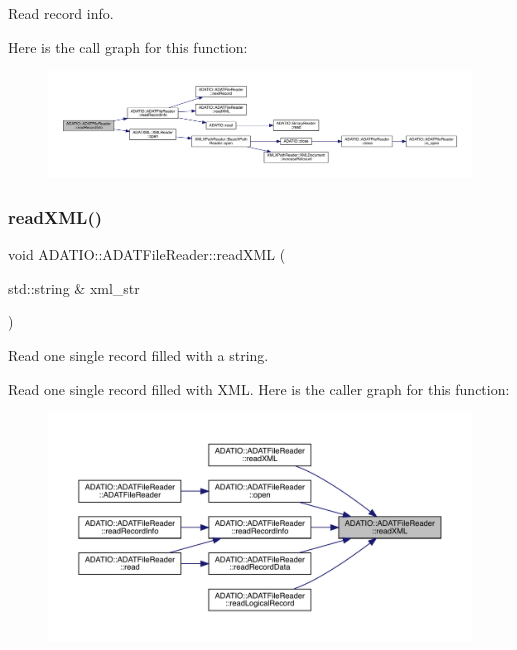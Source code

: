 Read record info. 

Here is the call graph for this function\+:
\nopagebreak
\begin{figure}[H]
\begin{center}
\leavevmode
\includegraphics[width=350pt]{db/de5/group__qio_ga4d771a46d7db77cd0ae5999113733795_cgraph}
\end{center}
\end{figure}
\mbox{\label{group__qio_gae57feac2bf53666ac092bb0a43125226}} 
\subsubsection{\texorpdfstring{readXML()}{readXML()}\hspace{0.1cm}{\footnotesize\ttfamily [1/2]}}
{\footnotesize\ttfamily void A\+D\+A\+T\+I\+O\+::\+A\+D\+A\+T\+File\+Reader\+::read\+X\+ML (\begin{DoxyParamCaption}\item[{std\+::string \&}]{xml\+\_\+str }\end{DoxyParamCaption})\hspace{0.3cm}{\ttfamily [protected]}}



Read one single record filled with a string. 

Read one single record filled with X\+ML. Here is the caller graph for this function\+:
\nopagebreak
\begin{figure}[H]
\begin{center}
\leavevmode
\includegraphics[width=350pt]{db/de5/group__qio_gae57feac2bf53666ac092bb0a43125226_icgraph}
\end{center}
\end{figure}
\mbox{\label{group__qio_ga9a1ac411577bd50e643f483119318893}} 
